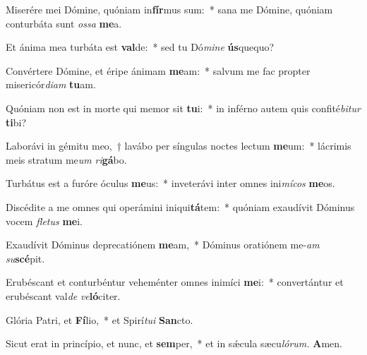\item Miserére mei Dómine, quóniam in\textbf{fír}mus sum:~* sana me Dómine, quóniam conturbáta sunt \textit{ossa} \textbf{me}a.
\item Et ánima mea turbáta est \textbf{val}de:~* sed tu Dó\textit{mine} \textbf{ús}quequo?
\item Convértere Dómine, et éripe ánimam \textbf{me}am:~* salvum me fac propter misericór\textit{diam} \textbf{tu}am.
\item Quóniam non est in morte qui memor sit \textbf{tu}i:~* in inférno autem quis confité\textit{bitur} \textbf{ti}bi?
\item Laborávi in gémitu meo,~† lavábo per síngulas noctes le\-ctum \textbf{me}um:~* lácrimis meis stratum me\hspace{0.03em}\textit{um} \textit{ri}\textbf{gá}bo.
\item Turbátus est a furóre óculus \textbf{me}us:~* inveterávi inter omnes ini\textit{mícos} \textbf{me}os.
\item Discédite a me omnes qui operámini iniqui\textbf{tá}tem:~* quóniam exaudívit Dóminus vocem \textit{fletus} \textbf{me}i.
\item Exaudívit Dóminus deprecatiónem \textbf{me}am,~* Dóminus oratiónem me-\textit{am} \textit{su}\textbf{scé}pit.
\item Erubéscant et conturbéntur veheménter omnes inimíci \textbf{me}i:~* convertántur et erubéscant val\hspace{0.03em}\textit{de} \textit{ve}\textbf{ló}citer.
\item Glória Patri, et \textbf{Fí}lio,~* et Spirí\hspace{0.03em}\textit{tui} \textbf{San}cto.
\item Sicut erat in princípio, et nunc, et \textbf{sem}per,~* et in sǽcula sæcu\hspace{0.03em}\textit{lórum.} \textbf{A}men.
